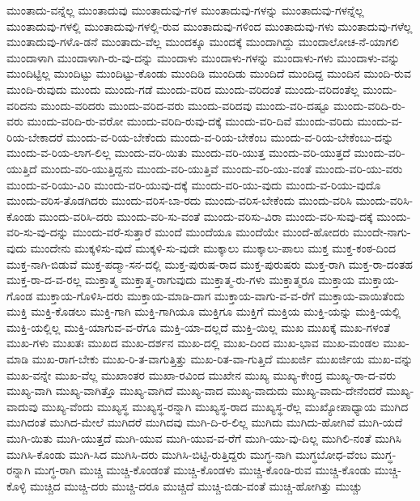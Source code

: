 {ಮುಂತಾದು-ವನ್ನೆಲ್ಲ
ಮುಂತಾದುವು
ಮುಂತಾದುವು-ಗಳ
ಮುಂತಾದುವು-ಗಳನ್ನು
ಮುಂತಾದುವು-ಗಳನ್ನೆಲ್ಲ
ಮುಂತಾದುವು-ಗಳಲ್ಲಿ
ಮುಂತಾದುವು-ಗಳಲ್ಲಿ-ರುವ
ಮುಂತಾದುವು-ಗಳಿಂದ
ಮುಂತಾದುವು-ಗಳು
ಮುಂತಾದುವು-ಗಳೆಲ್ಲ
ಮುಂತಾದುವು-ಗಳೊ-ಡನೆ
ಮುಂತಾದು-ವೆಲ್ಲ
ಮುಂದಕ್ಕೂ
ಮುಂದಕ್ಕೆ
ಮುಂದಾಗಿದ್ದು
ಮುಂದಾಲೋಚ-ನೆ-ಯಾಗಲಿ
ಮುಂದಾಳಾಗಿ
ಮುಂದಾಳಾಗಿ-ರು-ವು-ದನ್ನು
ಮುಂದಾಳು
ಮುಂದಾಳು-ಗಳನ್ನು
ಮುಂದಾಳು-ಗಳು
ಮುಂದಾಳು-ವನ್ನು
ಮುಂದಿಟ್ಟಿಲ್ಲ
ಮುಂದಿಟ್ಟು
ಮುಂದಿಟ್ಟು-ಕೊಂಡು
ಮುಂದಿಡಿ
ಮುಂದಿಡು
ಮುಂದಿದೆ
ಮುಂದಿದ್ದ
ಮುಂದಿನ
ಮುಂದಿ-ರುವ
ಮುಂದಿ-ರುವುದು
ಮುಂದು
ಮುಂದು-ಗಡೆ
ಮುಂದು-ವರಿದ
ಮುಂದು-ವರಿದಂತೆ
ಮುಂದು-ವರಿದಂತೆಲ್ಲ
ಮುಂದು-ವರಿದನು
ಮುಂದು-ವರಿದರು
ಮುಂದು-ವರಿದ-ವರು
ಮುಂದು-ವರಿದವು
ಮುಂದು-ವರಿ-ದಷ್ಟೂ
ಮುಂದು-ವರಿದಿ-ರು-ವರು
ಮುಂದು-ವರಿದಿ-ರು-ವರೋ
ಮುಂದು-ವರಿದಿ-ರುವು-ದಕ್ಕೆ
ಮುಂದು-ವರಿ-ದಿವೆ
ಮುಂದು-ವರಿದು
ಮುಂದು-ವ-ರಿಯ-ಬೇಕಾದರೆ
ಮುಂದು-ವ-ರಿಯ-ಬೇಕೆಂದು
ಮುಂದು-ವ-ರಿಯ-ಬೇಕೆಂಬ
ಮುಂದು-ವ-ರಿಯ-ಬೇಕೆಂಬು-ದನ್ನು
ಮುಂದು-ವ-ರಿಯ-ಲಾಗ-ಲಿಲ್ಲ
ಮುಂದು-ವರಿ-ಯಿತು
ಮುಂದು-ವರಿ-ಯುತ್ತ
ಮುಂದು-ವರಿ-ಯುತ್ತದೆ
ಮುಂದು-ವರಿ-ಯುತ್ತಿದೆ
ಮುಂದು-ವರಿ-ಯುತ್ತಿದ್ದನು
ಮುಂದು-ವರಿ-ಯುತ್ತಿವೆ
ಮುಂದು-ವರಿ-ಯು-ವಂತೆ
ಮುಂದು-ವರಿ-ಯು-ವರು
ಮುಂದು-ವ-ರಿಯು-ವಿರಿ
ಮುಂದು-ವರಿ-ಯುವು-ದಕ್ಕೆ
ಮುಂದು-ವರಿ-ಯು-ವುದು
ಮುಂದು-ವ-ರಿಯು-ವುದೊ
ಮುಂದು-ವರಿಸ-ತೊಡಗಿದರು
ಮುಂದು-ವರಿಸ-ಬಾ-ರದು
ಮುಂದು-ವರಿಸ-ಬೇಕೆಂದು
ಮುಂದು-ವರಿಸಿ
ಮುಂದು-ವರಿಸಿ-ಕೊಂಡು
ಮುಂದು-ವರಿಸಿ-ದರು
ಮುಂದು-ವರಿ-ಸು-ವಂತೆ
ಮುಂದು-ವರಿಸು-ವಿರಾ
ಮುಂದು-ವರಿ-ಸುವು-ದಕ್ಕೆ
ಮುಂದು-ವರಿ-ಸು-ವು-ದನ್ನು
ಮುಂದು-ವರೆ-ಸುತ್ತಾರೆ
ಮುಂದೆ
ಮುಂದೆಯೂ
ಮುಂದೆಯೇ
ಮುಂದೆ-ಹೋದರು
ಮುಂದೇ-ನಾಗು-ವುದು
ಮುಂದೇನು
ಮುಕ್ಕಳಿಸು-ವುದೆ
ಮುಕ್ಕಳಿ-ಸು-ವುದೇ
ಮುಕ್ಕಾಲು
ಮುಕ್ಕಾಲು-ಪಾಲು
ಮುಕ್ತ
ಮುಕ್ತ-ಕಂಠ-ದಿಂದ
ಮುಕ್ತ-ನಾಗಿ-ಬಿಡುವೆ
ಮುಕ್ತ-ಪದ್ಮಾ-ಸನ-ದಲ್ಲಿ
ಮುಕ್ತ-ಪುರುಷ-ರಾದ
ಮುಕ್ತ-ಪುರುಷರು
ಮುಕ್ತ-ರಾಗಿ
ಮುಕ್ತ-ರಾ-ದಂತಹ
ಮುಕ್ತ-ರಾ-ದ-ವ-ರಲ್ಲ
ಮುಕ್ತಾತ್ಮ
ಮುಕ್ತಾತ್ಮ-ರಾಗುವುದು
ಮುಕ್ತಾತ್ಮ-ರು-ಗಳು
ಮುಕ್ತಾತ್ಮರೂ
ಮುಕ್ತಾಯ
ಮುಕ್ತಾಯ-ಗೊಂಡ
ಮುಕ್ತಾಯ-ಗೊಳಿಸಿ-ದರು
ಮುಕ್ತಾಯ-ಮಾಡಿ-ದಾಗ
ಮುಕ್ತಾಯ-ವಾಗು-ವ-ವ-ರೆಗೆ
ಮುಕ್ತಾಯ-ವಾಯಿತೆಂದು
ಮುಕ್ತಿ
ಮುಕ್ತಿ-ಕೊಡಲು
ಮುಕ್ತಿ-ಗಾಗಿ
ಮುಕ್ತಿ-ಗಾಗಿಯೂ
ಮುಕ್ತಿಗೂ
ಮುಕ್ತಿಗೆ
ಮುಕ್ತಿಯ
ಮುಕ್ತಿ-ಯನ್ನು
ಮುಕ್ತಿ-ಯಲ್ಲಿ
ಮುಕ್ತಿ-ಯಲ್ಲಿಲ್ಲ
ಮುಕ್ತಿ-ಯಾಗುವ-ವ-ರೆಗೂ
ಮುಕ್ತಿ-ಯಾ-ದಲ್ಲದೆ
ಮುಕ್ತಿ-ಯಿಲ್ಲ
ಮುಖ
ಮುಖಕ್ಕೆ
ಮುಖ-ಗಳಂತೆ
ಮುಖ-ಗಳು
ಮುಖತಃ
ಮುಖದ
ಮುಖ-ದರ್ಶನ
ಮುಖ-ದಲ್ಲಿ
ಮುಖ-ದಿಂದ
ಮುಖ-ಭಾವ
ಮುಖ-ಮಂಡಲ
ಮುಖ-ಮಾಡಿ
ಮುಖ-ರಾಗ-ಬೇಕು
ಮುಖ-ರಿ-ತ-ವಾಗುತ್ತಿತ್ತು
ಮುಖ-ರಿತ-ವಾ-ಗುತ್ತಿದೆ
ಮುಖರ್ಜಿ
ಮುಖರ್ಜಿಯ
ಮುಖ-ವನ್ನು
ಮುಖ-ವನ್ನೇ
ಮುಖ-ವೆಲ್ಲ
ಮುಖಾಂತರ
ಮುಖಾ-ರವಿಂದ
ಮುಖೇನ
ಮುಖ್ಯ
ಮುಖ್ಯ-ಕೇಂದ್ರ
ಮುಖ್ಯ-ರಾ-ದ-ವರು
ಮುಖ್ಯ-ವಾಗಿ
ಮುಖ್ಯ-ವಾಗಿತ್ತೊ
ಮುಖ್ಯ-ವಾಗಿದೆ
ಮುಖ್ಯ-ವಾದ
ಮುಖ್ಯ-ವಾದುದು
ಮುಖ್ಯ-ವಾದು-ದೇನೆಂದರೆ
ಮುಖ್ಯ-ವಾದುವು
ಮುಖ್ಯ-ವೆಂದು
ಮುಖ್ಯಸ್ಥ
ಮುಖ್ಯಸ್ಥ-ರನ್ನಾಗಿ
ಮುಖ್ಯಸ್ಥ-ರಾದ
ಮುಖ್ಯಸ್ಥ-ರೆಲ್ಲ
ಮುಖ್ಯೋಪಾಧ್ಯಾಯ
ಮುಗಿದ
ಮುಗಿದಂತೆ
ಮುಗಿದ-ಮೇಲೆ
ಮುಗಿದರೆ
ಮುಗಿದವು
ಮುಗಿ-ದಿ-ರ-ಲಿಲ್ಲ
ಮುಗಿದು
ಮುಗಿದು-ಹೋಗಿವೆ
ಮುಗಿ-ಯದೆ
ಮುಗಿ-ಯಿತು
ಮುಗಿ-ಯುತ್ತದೆ
ಮುಗಿ-ಯುವ
ಮುಗಿ-ಯುವ-ವ-ರೆಗೆ
ಮುಗಿ-ಯು-ವು-ದಿಲ್ಲ
ಮುಗಿಲಿ-ನಂತೆ
ಮುಗಿಸಿ
ಮುಗಿಸಿ-ಕೊಂಡು
ಮುಗಿ-ಸಿದ
ಮುಗಿಸಿ-ದರು
ಮುಗಿಸಿ-ಬಿಟ್ಟಿ-ರುತ್ತಿದ್ದರು
ಮುಗ್ಧ-ನಾಗಿ
ಮುಗ್ಧಬೋಧ-ವೆಂಬ
ಮುಗ್ಧ-ರನ್ನಾಗಿ
ಮುಗ್ಧ-ರಾಗಿ
ಮುಚ್ಚಿ
ಮುಚ್ಚಿ-ಕೊಂಡಂತೆ
ಮುಚ್ಚಿ-ಕೊಂಡಳು
ಮುಚ್ಚಿ-ಕೊಂಡಿ-ರುವ
ಮುಚ್ಚಿ-ಕೊಂಡು
ಮುಚ್ಚಿ-ಕೊಳ್ಳಿ
ಮುಚ್ಚಿದ
ಮುಚ್ಚಿ-ದರು
ಮುಚ್ಚಿ-ದರೂ
ಮುಚ್ಚಿದೆ
ಮುಚ್ಚಿ-ಬಿಡು-ವಂತೆ
ಮುಚ್ಚಿ-ಹೋಗಿತ್ತು
ಮುಚ್ಚು
}
